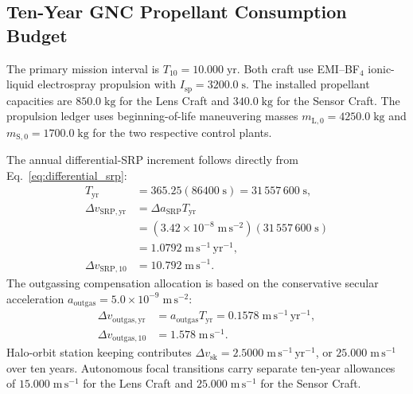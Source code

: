 \documentclass[10pt,twocolumn]{IEEEtran}
\begin{document}
\subsection{Ten-Year GNC Propellant Consumption Budget}
\label{sec:gnc_propellant_lifecycle}

The primary mission interval is $T_{10}=10.000\;\mathrm{yr}$.  Both craft use
EMI--BF$_4$ ionic-liquid electrospray propulsion with
$I_{\mathrm{sp}}=3200.0\;\mathrm{s}$.  The installed propellant capacities are
$850.0\;\mathrm{kg}$ for the Lens Craft and $340.0\;\mathrm{kg}$ for the
Sensor Craft.  The propulsion ledger uses beginning-of-life maneuvering masses
$m_{\mathrm{L},0}=4250.0\;\mathrm{kg}$ and
$m_{\mathrm{S},0}=1700.0\;\mathrm{kg}$ for the two respective control plants.

The annual differential-SRP increment follows directly from
Eq.~\eqref{eq:differential_srp}:
\begin{equation}
\begin{aligned}
T_{\mathrm{yr}}&=365.25(86400\;\mathrm{s})
=31\,557\,600\;\mathrm{s}, \\
\Delta v_{\mathrm{SRP,yr}}
&=\Delta a_{\mathrm{SRP}}T_{\mathrm{yr}} \\
&=(3.42\times10^{-8}\;\mathrm{m\,s^{-2}})
(31\,557\,600\;\mathrm{s}) \\
&=1.0792\;\mathrm{m\,s^{-1}\,yr^{-1}}, \\
\Delta v_{\mathrm{SRP},10}&=10.792\;\mathrm{m\,s^{-1}}.
\end{aligned}
\label{eq:srp_lifecycle_delta_v}
\end{equation}
The outgassing compensation allocation is based on the conservative secular
acceleration $a_{\mathrm{outgas}}=5.0\times10^{-9}\;\mathrm{m\,s^{-2}}$:
\begin{equation}
\begin{aligned}
\Delta v_{\mathrm{outgas,yr}}
&=a_{\mathrm{outgas}}T_{\mathrm{yr}}
=0.1578\;\mathrm{m\,s^{-1}\,yr^{-1}}, \\
\Delta v_{\mathrm{outgas},10}
&=1.578\;\mathrm{m\,s^{-1}}.
\end{aligned}
\label{eq:outgassing_lifecycle_delta_v}
\end{equation}
Halo-orbit station keeping contributes
$\Delta v_{\mathrm{sk}}=2.5000\;\mathrm{m\,s^{-1}\,yr^{-1}}$, or
$25.000\;\mathrm{m\,s^{-1}}$ over ten years.  Autonomous focal transitions
carry separate ten-year allowances of $15.000\;\mathrm{m\,s^{-1}}$ for the
Lens Craft and $25.000\;\mathrm{m\,s^{-1}}$ for the Sensor Craft.
\end{document}
